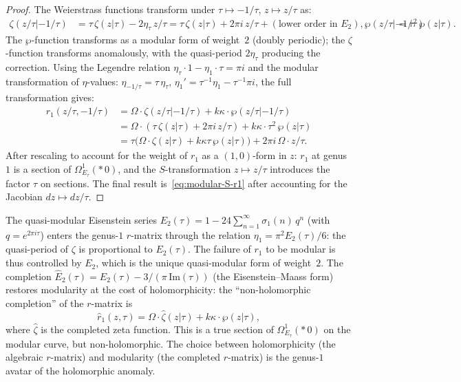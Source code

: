 \begin{proof}
The Weierstrass functions transform under $\tau \mapsto -1/\tau$,
$z \mapsto z/\tau$ as:
\begin{align}
\zeta(z/\tau | -1/\tau)
&= \tau\, \zeta(z|\tau) - 2\eta_\tau\, z/\tau
= \tau\, \zeta(z|\tau) + 2\pi i\, z/\tau
+ (\text{lower order in }E_2), %
\wp(z/\tau | -1/\tau)
&= \tau^2\, \wp(z|\tau). %
\end{align}
The $\wp$-function transforms as a modular form of weight~$2$
(doubly periodic); the $\zeta$-function transforms anomalously,
with the quasi-period $2\eta_\tau$ producing the correction.
Using the Legendre relation $\eta_\tau \cdot 1 - \eta_1 \cdot \tau
= \pi i$ and the modular transformation of $\eta$-values:
$\eta_{-1/\tau} = \tau\,\eta_\tau$, $\eta_1' = \tau^{-1}\eta_1
- \tau^{-1}\pi i$, the full transformation gives:
\begin{align*}
r_1(z/\tau, -1/\tau)
&= \Omega \cdot \zeta(z/\tau | -1/\tau) + k\kappa \cdot
\wp(z/\tau | -1/\tau) \\
&= \Omega \cdot (\tau\,\zeta(z|\tau) + 2\pi i\, z/\tau)
+ k\kappa \cdot \tau^2\, \wp(z|\tau) \\
&= \tau\bigl(\Omega \cdot \zeta(z|\tau) + k\kappa\tau\,
\wp(z|\tau)\bigr) + 2\pi i\, \Omega \cdot z/\tau.
\end{align*}
After rescaling to account for the weight of $r_1$ as a
$(1,0)$-form in $z$: $r_1$ at genus~$1$ is a section of
$\Omega^1_{E_\tau}(\ast\, 0)$, and the $S$-transformation
$z \mapsto z/\tau$ introduces the factor $\tau$ on sections.
The final result is~\eqref{eq:modular-S-r1} after accounting
for the Jacobian $dz \mapsto dz/\tau$.
\end{proof}

\begin{remark}
The quasi-modular Eisenstein series $E_2(\tau) = 1 - 24
\sum_{n=1}^\infty \sigma_1(n)\, q^n$ (with $q = e^{2\pi i\tau}$)
enters the genus-$1$ $r$-matrix through the relation
$\eta_1 = \pi^2 E_2(\tau)/6$: the quasi-period of $\zeta$ is
proportional to $E_2(\tau)$. The failure of $r_1$ to be modular
is thus controlled by $E_2$, which is the unique quasi-modular
form of weight~$2$. The completion $\widehat{E}_2(\tau) =
E_2(\tau) - 3/(\pi\, \mathrm{Im}(\tau))$ (the Eisenstein--Maass
form) restores modularity at the cost of holomorphicity: the
``non-holomorphic completion'' of the $r$-matrix is
\[
\widehat{r}_1(z, \tau)
= \Omega \cdot \widehat{\zeta}(z|\tau) + k\kappa \cdot \wp(z|\tau),
\]
where $\widehat{\zeta}$ is the completed zeta function. This is
a true section of $\Omega^1_{E_\tau}(\ast\, 0)$ on the modular
curve, but non-holomorphic. The choice between holomorphicity
(the algebraic $r$-matrix) and modularity (the completed
$r$-matrix) is the genus-$1$ avatar of the holomorphic anomaly.
\end{remark}

